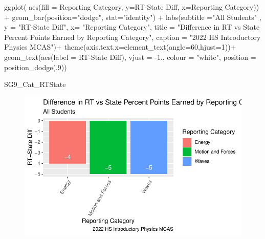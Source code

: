 \documentclass[
  letterpaper,
  DIV=11,
  numbers=noendperiod]{scrartcl}
\newenvironment{Shaded}{\begin{snugshade}}{\end{snugshade}}
\newcommand{\AttributeTok}[1]{\textcolor[rgb]{0.40,0.45,0.13}{#1}}
\newcommand{\DecValTok}[1]{\textcolor[rgb]{0.68,0.00,0.00}{#1}}
\newcommand{\FloatTok}[1]{\textcolor[rgb]{0.68,0.00,0.00}{#1}}
\newcommand{\FunctionTok}[1]{\textcolor[rgb]{0.28,0.35,0.67}{#1}}
\newcommand{\NormalTok}[1]{\textcolor[rgb]{0.00,0.23,0.31}{#1}}
\newcommand{\SpecialCharTok}[1]{\textcolor[rgb]{0.37,0.37,0.37}{#1}}
\newcommand{\StringTok}[1]{\textcolor[rgb]{0.13,0.47,0.30}{#1}}
\begin{document}
\begin{Shaded}
\begin{Highlighting}[]
 \FunctionTok{ggplot}\NormalTok{( }\FunctionTok{aes}\NormalTok{(}\AttributeTok{fill =} \StringTok{\textasciigrave{}}\AttributeTok{Reporting Category}\StringTok{\textasciigrave{}}\NormalTok{, }\AttributeTok{y=}\StringTok{\textasciigrave{}}\AttributeTok{RT{-}State Diff}\StringTok{\textasciigrave{}}\NormalTok{, }\AttributeTok{x=}\StringTok{\textasciigrave{}}\AttributeTok{Reporting Category}\StringTok{\textasciigrave{}}\NormalTok{)) }\SpecialCharTok{+}
    \FunctionTok{geom\_bar}\NormalTok{(}\AttributeTok{position=}\StringTok{"dodge"}\NormalTok{, }\AttributeTok{stat=}\StringTok{"identity"}\NormalTok{) }\SpecialCharTok{+}
  \FunctionTok{labs}\NormalTok{(}\AttributeTok{subtitle =}\StringTok{"All Students"}\NormalTok{ ,}
       \AttributeTok{y =} \StringTok{"RT{-}State Diff"}\NormalTok{,}
       \AttributeTok{x=} \StringTok{"Reporting Category"}\NormalTok{,}
       \AttributeTok{title =} \StringTok{"Difference in RT vs State Percent Points Earned by Reporting Category"}\NormalTok{,}
      \AttributeTok{caption =} \StringTok{"2022 HS Introductory Physics MCAS"}\NormalTok{)}\SpecialCharTok{+}
       \FunctionTok{theme}\NormalTok{(}\AttributeTok{axis.text.x=}\FunctionTok{element\_text}\NormalTok{(}\AttributeTok{angle=}\DecValTok{60}\NormalTok{,}\AttributeTok{hjust=}\DecValTok{1}\NormalTok{))}\SpecialCharTok{+}
   \FunctionTok{geom\_text}\NormalTok{(}\FunctionTok{aes}\NormalTok{(}\AttributeTok{label =} \StringTok{\textasciigrave{}}\AttributeTok{RT{-}State Diff}\StringTok{\textasciigrave{}}\NormalTok{), }\AttributeTok{vjust =} \SpecialCharTok{{-}}\FloatTok{1.}\NormalTok{, }\AttributeTok{colour =} \StringTok{"white"}\NormalTok{, }\AttributeTok{position =} \FunctionTok{position\_dodge}\NormalTok{(.}\DecValTok{9}\NormalTok{))}

\NormalTok{SG9\_Cat\_RTState}
\end{Highlighting}
\end{Shaded}

\begin{figure}[H]

{\centering \includegraphics{theresaSzczepanski_final_files/figure-pdf/unnamed-chunk-16-1.pdf}

}

\end{figure}
\end{document}
